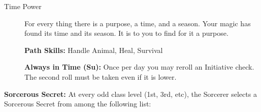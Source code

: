 \begin{description}
\item[Time Power] For every thing there is a purpose, a time, and a season. Your magic has found its time and its season. It is to you to find for it a purpose.

\textbf{Path Skills:} Handle Animal, Heal, Survival

\textbf{Always in Time (Su):} Once per day you may reroll an Initiative check. The second roll must be taken even if it is lower.


\end{description}

\textbf{Sorcerous Secret:} At every odd class level (1st, 3rd, etc), the Sorcerer selects a Sorcerous Secret from among the following list:

